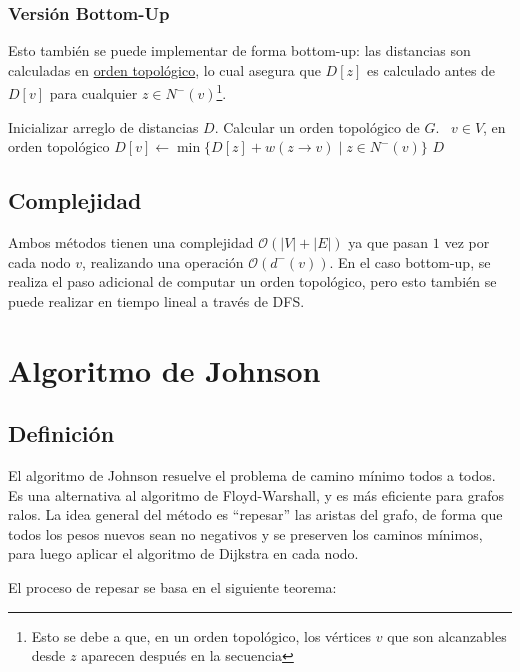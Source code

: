 \documentclass[a4paper]{report}
\newcommand{\BigO}[1]{\ensuremath{\mathcal{O}(#1)}}
\newcommand{\Each}{\kw{each}\ }
\begin{document}
\subsubsection{Versión Bottom-Up}

Esto también se puede implementar de forma bottom-up: las distancias son calculadas en \hyperref[orden-topologico]{orden topológico}, lo cual asegura que $D[z]$ es calculado antes de $D[v]$ para cualquier $z \in N^-(v)$\footnote{Esto se debe a que, en un orden topológico, los vértices $v$ que son alcanzables desde $z$ aparecen después en la secuencia}.

\begin{codebox}
    \li Inicializar arreglo de distancias $D$.
    \li Calcular un orden topológico de $G$.
    \li \For \Each $v \in V$, en orden topológico \Do
    \li $D[v] \gets \min{\{D[z] + w(z \rightarrow v) \mid z \in N^-(v)\}}$
    \End
    \li \Return $D$
\end{codebox}

\subsection{Complejidad}

Ambos métodos tienen una complejidad \BigO{|V| + |E|} ya que pasan $1$ vez por cada nodo $v$, realizando una operación \BigO{d^-(v)}. En el caso bottom-up, se realiza el paso adicional de computar un orden topológico, pero esto también se puede realizar en tiempo lineal a través de DFS.

\section{Algoritmo de Johnson}

\subsection{Definición}

El algoritmo de Johnson resuelve el problema de camino mínimo todos a todos. Es una alternativa al algoritmo de Floyd-Warshall, y es más eficiente para grafos ralos. La idea general del método es ``repesar'' las aristas del grafo, de forma que todos los pesos nuevos sean no negativos y se preserven los caminos mínimos, para luego aplicar el algoritmo de Dijkstra en cada nodo.

El proceso de repesar se basa en el siguiente teorema:
\end{document}
